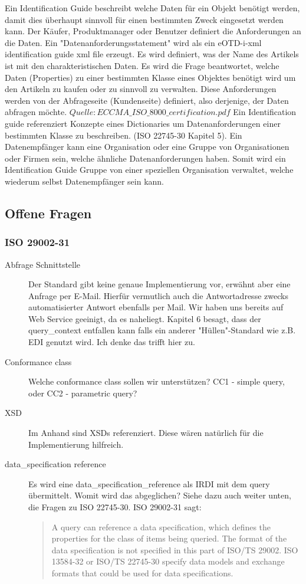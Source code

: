 Ein Identification Guide beschreibt welche Daten für ein Objekt benötigt werden, damit dies überhaupt sinnvoll für einen bestimmten Zweck eingesetzt werden kann. Der Käufer, Produktmanager oder Benutzer definiert die Anforderungen an die Daten. Ein "Datenanforderungsstatement" wird als ein eOTD-i-xml identification guide xml file erzeugt. Es wird definiert, was der Name des Artikels ist mit den charakteristischen Daten. Es wird die Frage beantwortet, welche Daten (Properties) zu einer bestimmten Klasse eines Objektes benötigt wird um den Artikeln zu kaufen oder zu sinnvoll zu verwalten. Diese Anforderungen werden von der Abfrageseite (Kundenseite) definiert, also derjenige, der Daten abfragen möchte. \(Quelle: ECCMA\_ISO\_8000\_certification.pdf\)
Ein Identification guide referenziert Konzepte eines Dictionaries um Datenanforderungen einer bestimmten Klasse zu beschreiben. (ISO 22745-30 Kapitel 5). 
Ein Datenempfänger kann eine Organisation oder eine Gruppe von Organisationen oder Firmen sein, welche ähnliche Datenanforderungen haben. Somit wird ein Identification Guide Gruppe von einer speziellen Organisation verwaltet, welche wiederum selbst Datenempfänger sein kann.  

\subsection{Offene Fragen}

\subsubsection{ISO 29002-31}
\begin{description}
\item[Abfrage Schnittstelle] Der Standard gibt keine genaue Implementierung vor, erwähnt aber eine Anfrage per E-Mail. Hierfür vermutlich auch die Antwortadresse zwecks automatisierter Antwort ebenfalls per Mail. Wir haben uns bereits auf Web Service geeinigt, da es naheliegt. Kapitel 6 besagt, dass der query\_context entfallen kann falls ein anderer "Hüllen"-Standard wie z.B. EDI genutzt wird. Ich denke das trifft hier zu. 
\item[Conformance class] Welche conformance class sollen wir unterstützen? CC1 - simple query, oder CC2 - parametric query?
\item[XSD] Im Anhand sind XSDs referenziert. Diese wären natürlich für die Implementierung hilfreich.
\item[data\_specification reference] Es wird eine data\_specification\_reference als IRDI mit dem query übermittelt. Womit wird das abgeglichen? Siehe dazu auch weiter unten, die Fragen zu ISO 22745-30.
ISO 29002-31 sagt: 
\begin{quotation}
A query can reference a data specification, which defines the properties for the class of items being queried. The format of the data specification is not specified in this part of ISO/TS 29002. ISO 13584-32 or ISO/TS 22745-30 specify data models and exchange formats that could be used for data specifications.
\end{quotation}
\end{description}



